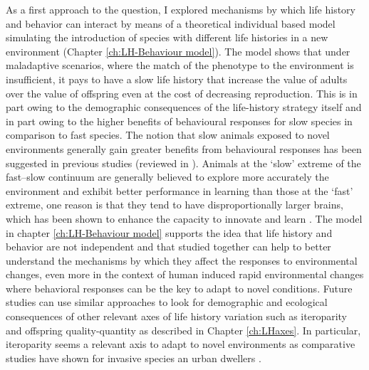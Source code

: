 As a first approach to the question, I explored mechanisms by which life history
and behavior can interact by means of a theoretical individual based model
simulating the introduction of species with different life histories in a new
environment (Chapter \ref{ch:LH-Behaviour model}). The model shows that under
maladaptive scenarios, where the match of the phenotype to the environment is
insufficient, it pays to have a slow life history that increase the value of
adults over the value of offspring even at the cost of decreasing reproduction.
This is in part owing to the demographic consequences of the life-history
strategy itself and in part owing to the higher benefits of behavioural
responses for slow species in comparison to fast species.
The notion that slow animals exposed to novel environments generally gain
greater benefits from behavioural responses has been suggested in previous
studies (reviewed in \citet{Sol2016}). Animals at the ‘slow’ extreme of the
fast–slow continuum are generally believed to explore more accurately the
environment and exhibit better performance in learning than those at the ‘fast’
extreme, one reason is that they tend to have disproportionally larger brains,
which has been shown to enhance the capacity to innovate and learn
\citep{Lefebvre1997,Reader2002,Overington2009,Reader2011}. The model in chapter
\ref{ch:LH-Behaviour model} supports the idea that life history and behavior are
not independent and that studied together can help to better understand the
mechanisms by which they affect the responses to environmental changes, even
more in the context of human induced rapid environmental changes where
behavioral responses can be the key to adapt to novel conditions. Future studies
can use similar approaches to look for demographic and ecological consequences
of other relevant axes of life history variation such as iteroparity and
offspring quality-quantity as described in Chapter \ref{ch:LHaxes}. In
particular, iteroparity seems a relevant axis to adapt to novel environments as
comparative studies have shown for invasive species \citep{Sol2012a} an urban
dwellers \citep{Sol2014,Sayol2020}.

